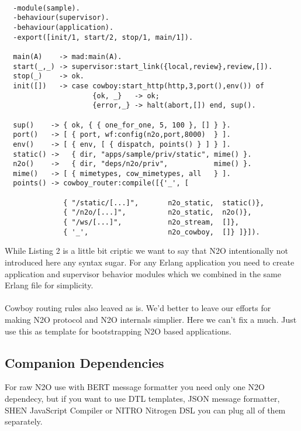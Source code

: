 \vspace{1\baselineskip}
\begin{lstlisting}[caption=sample.erl]

  -module(sample).
  -behaviour(supervisor).
  -behaviour(application).
  -export([init/1, start/2, stop/1, main/1]).

  main(A)    -> mad:main(A).
  start(_,_) -> supervisor:start_link({local,review},review,[]).
  stop(_)    -> ok.
  init([])   -> case cowboy:start_http(http,3,port(),env()) of
                     {ok, _}   -> ok;
                     {error,_} -> halt(abort,[]) end, sup().

  sup()    -> { ok, { { one_for_one, 5, 100 }, [] } }.
  port()   -> [ { port, wf:config(n2o,port,8000)  } ].
  env()    -> [ { env, [ { dispatch, points() } ] } ].
  static() ->   { dir, "apps/sample/priv/static", mime() }.
  n2o()    ->   { dir, "deps/n2o/priv",           mime() }.
  mime()   -> [ { mimetypes, cow_mimetypes, all   } ].
  points() -> cowboy_router:compile([{'_', [

              { "/static/[...]",       n2o_static,  static()},
              { "/n2o/[...]",          n2o_static,  n2o()},
              { "/ws/[...]",           n2o_stream,  []},
              { '_',                   n2o_cowboy,  []} ]}]).
\end{lstlisting}
\vspace{1\baselineskip}

\newpage
While Listing 2 is a little bit criptic we want to say that N2O
intentionally not introduced here any syntax sugar.
For any Erlang application you need to create application
and supervisor behavior modules which we combined in the
same Erlang file for simplicity.

\paragraph{}
Cowboy routing rules also leaved as is.
We'd better to leave our efforts for making N2O protocol
and N2O internals simplier. Here we can't fix a much. Just use this
as template for bootstrapping N2O based applications.

\subsection{Companion Dependencies}
For raw N2O use with BERT message formatter you need only
one N2O dependecy, but if you want to use DTL templates,
JSON message formatter, SHEN JavaScript Compiler or NITRO
Nitrogen DSL you can plug all of them separately.

